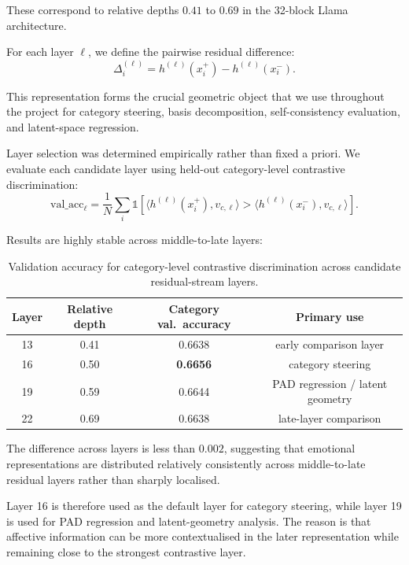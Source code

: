 \documentclass[12pt,twoside]{report}
\begin{document}
These correspond to relative depths $0.41$ to $0.69$ in the 32-block
Llama architecture.

For each layer $\ell$, we define the pairwise residual difference:
\begin{equation}
\Delta_i^{(\ell)}
=
h^{(\ell)}(x_i^+)
-
h^{(\ell)}(x_i^-).
\end{equation}

This representation forms the crucial geometric object that we use throughout the
project for category steering, basis decomposition, self-consistency
evaluation, and latent-space regression.

Layer selection was determined empirically rather than fixed a priori.
We evaluate each candidate layer using held-out category-level
contrastive discrimination:
\begin{equation}
\mathrm{val\_acc}_\ell
=
\frac{1}{N}
\sum_i
\mathbb{1}
\left[
\langle h^{(\ell)}(x_i^+), v_{c,\ell}\rangle
>
\langle h^{(\ell)}(x_i^-), v_{c,\ell}\rangle
\right].
\end{equation}

Results are highly stable across middle-to-late layers:

\begin{table}[H]
\centering
\begin{tabular}{c c c c}
\toprule
Layer & Relative depth & Category val.\ accuracy & Primary use \\
\midrule
13 & 0.41 & 0.6638 & early comparison layer \\
16 & 0.50 & \textbf{0.6656} & category steering \\
19 & 0.59 & 0.6644 & PAD regression / latent geometry \\
22 & 0.69 & 0.6638 & late-layer comparison \\
\bottomrule
\end{tabular}
\caption{
Validation accuracy for category-level contrastive discrimination across
candidate residual-stream layers.
}
\label{tab:layer-selection}
\end{table}

The difference across layers is less than $0.002$, suggesting that
emotional representations are distributed relatively consistently across
middle-to-late residual layers rather than sharply localised.

Layer 16 is therefore used as the default layer for category steering,
while layer 19 is used for PAD regression and latent-geometry analysis. The reason is that affective information can be more contextualised in the later representation while remaining close to the strongest contrastive layer.
\end{document}
